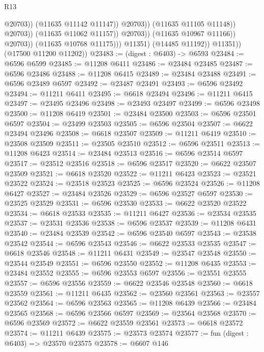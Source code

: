 \begin{lexlean}{R13}
\begin{coremodule}
                                              @20703))
                                          (@11635 @11142 @11147))
                                        @20703))
                                    (@11635 @11105 @11148))
                                  @20703))
                              (@11635 @11062 @11157))
                            @20703))
                        (@11635 @10967 @11166))
                      @20703))
                  (@11635 @10768 @11175)))
              @11351)
            (@14485 @11192))
          @11351))
      (@17500 @11200 @11202))
@23483 := (digest : @6403) -> @6593
@23484 := @6596 @6599
@23485 := @11208 @6411
@23486 := @23484 @23485
@23487 := @6596 @23486
@23488 := @11208 @6415
@23489 := @23484 @23488
@23491 := @6596 @23489 @6597
@23492 := @23487 @23491
@23493 := @6596 @23492
@23494 := @11211 @6411
@23495 := @6618 @23494
@23496 := @11211 @6415
@23497 := @23495 @23496
@23498 := @23493 @23497
@23499 := @6596 @23498
@23500 := @11208 @6419
@23501 := @23484 @23500
@23503 := @6596 @23501 @6597
@23504 := @23499 @23503
@23505 := @6596 @23504
@23507 := @6622 @23494 @23496
@23508 := @6618 @23507
@23509 := @11211 @6419
@23510 := @23508 @23509
@23511 := @23505 @23510
@23512 := @6596 @23511
@23513 := @11208 @6423
@23514 := @23484 @23513
@23516 := @6596 @23514 @6597
@23517 := @23512 @23516
@23518 := @6596 @23517
@23520 := @6622 @23507 @23509
@23521 := @6618 @23520
@23522 := @11211 @6423
@23523 := @23521 @23522
@23524 := @23518 @23523
@23525 := @6596 @23524
@23526 := @11208 @6427
@23527 := @23484 @23526
@23529 := @6596 @23527 @6597
@23530 := @23525 @23529
@23531 := @6596 @23530
@23533 := @6622 @23520 @23522
@23534 := @6618 @23533
@23535 := @11211 @6427
@23536 := @23534 @23535
@23537 := @23531 @23536
@23538 := @6596 @23537
@23539 := @11208 @6431
@23540 := @23484 @23539
@23542 := @6596 @23540 @6597
@23543 := @23538 @23542
@23544 := @6596 @23543
@23546 := @6622 @23533 @23535
@23547 := @6618 @23546
@23548 := @11211 @6431
@23549 := @23547 @23548
@23550 := @23544 @23549
@23551 := @6596 @23550
@23552 := @11208 @6435
@23553 := @23484 @23552
@23555 := @6596 @23553 @6597
@23556 := @23551 @23555
@23557 := @6596 @23556
@23559 := @6622 @23546 @23548
@23560 := @6618 @23559
@23561 := @11211 @6435
@23562 := @23560 @23561
@23563 := @23557 @23562
@23564 := @6596 @23563
@23565 := @11208 @6439
@23566 := @23484 @23565
@23568 := @6596 @23566 @6597
@23569 := @23564 @23568
@23570 := @6596 @23569
@23572 := @6622 @23559 @23561
@23573 := @6618 @23572
@23574 := @11211 @6439
@23575 := @23573 @23574
@23577 := fun (digest : @6403) => @23570 @23575
@23578 := @6607 @146

\end{coremodule}
\end{lexlean}
